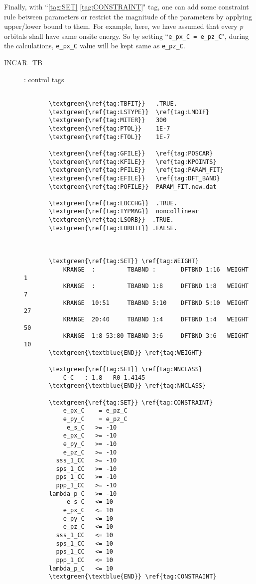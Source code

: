 \documentclass[a4paper,12pt]{scrartcl}
\makeatletter
\def\namedlabel#1#2{\begingroup
    #2%
    \def\@currentlabel{#2}%
    \phantomsection\label{#1}\endgroup
}
\newcommand{\textblue}[1]{\textcolor{blue!85!white}{\texttt{#1}}}
\newcommand{\textgreen}[1]{\textcolor{green!50!black}{\texttt{#1}}}
\makeatother
\begin{document}
			Finally, with ``\ref{tag:SET} \ref{tag:CONSTRAINT}" tag, one can add some constraint rule between parameters or restrict the magnitude of the parameters by applying upper/lower bound to them. For example, here, we have assumed that every $p$ orbitals shall have same onsite energy. So by setting ``\texttt{e\_px\_C = e\_pz\_C}",  during the calculations, \texttt{e\_px\_C} value will be kept same as \texttt{e\_pz\_C}. 
			
		
			\begin{description}
			\item[\namedlabel{tag:INCAR_TB}{INCAR\_TB}] : control tags
\begin{Verbatim}[commandchars=\\\{\},gobble=4, frame=single, framesep=2mm, 
    label= example of INCAR-TB for Graphene,
    labelposition=bottomline]
     	
       \textgreen{\ref{tag:TBFIT}}   .TRUE.  
       \textgreen{\ref{tag:LSTYPE}}  \ref{tag:LMDIF} 
       \textgreen{\ref{tag:MITER}}   300  
       \textgreen{\ref{tag:PTOL}}    1E-7  
       \textgreen{\ref{tag:FTOL}}    1E-7  

       \textgreen{\ref{tag:GFILE}}   \ref{tag:POSCAR}  
       \textgreen{\ref{tag:KFILE}}   \ref{tag:KPOINTS}  
       \textgreen{\ref{tag:PFILE}}   \ref{tag:PARAM_FIT}
       \textgreen{\ref{tag:EFILE}}   \ref{tag:DFT_BAND} 
       \textgreen{\ref{tag:POFILE}}  PARAM_FIT.new.dat  

       \textgreen{\ref{tag:LOCCHG}}  .TRUE.  
       \textgreen{\ref{tag:TYPMAG}}  noncollinear  
       \textgreen{\ref{tag:LSORB}}  .TRUE.  
       \textgreen{\ref{tag:LORBIT}} .FALSE.  

     

       \textgreen{\ref{tag:SET}} \ref{tag:WEIGHT}  
           KRANGE  :         TBABND :       DFTBND 1:16  WEIGHT 1
           KRANGE  :         TBABND 1:8     DFTBND 1:8   WEIGHT 7
           KRANGE  10:51     TBABND 5:10    DFTBND 5:10  WEIGHT 27
           KRANGE  20:40     TBABND 1:4     DFTBND 1:4   WEIGHT 50
           KRANGE  1:8 53:80 TBABND 3:6     DFTBND 3:6   WEIGHT 10
       \textgreen{\textblue{END}} \ref{tag:WEIGHT}  
       
       \textgreen{\ref{tag:SET}} \ref{tag:NNCLASS}  
           C-C   : 1.8   R0 1.4145
       \textgreen{\textblue{END}} \ref{tag:NNCLASS}  

       \textgreen{\ref{tag:SET}} \ref{tag:CONSTRAINT}  
           e_px_C    = e_pz_C
           e_py_C    = e_pz_C
            e_s_C   >= -10
           e_px_C   >= -10
           e_py_C   >= -10
           e_pz_C   >= -10
         sss_1_CC   >= -10
         sps_1_CC   >= -10
         pps_1_CC   >= -10
         ppp_1_CC   >= -10
       lambda_p_C   >= -10
            e_s_C   <= 10
           e_px_C   <= 10
           e_py_C   <= 10
           e_pz_C   <= 10
         sss_1_CC   <= 10
         sps_1_CC   <= 10
         pps_1_CC   <= 10
         ppp_1_CC   <= 10
       lambda_p_C   <= 10           
       \textgreen{\textblue{END}} \ref{tag:CONSTRAINT}  
\end{Verbatim}
		

\end{description}
\end{document}
